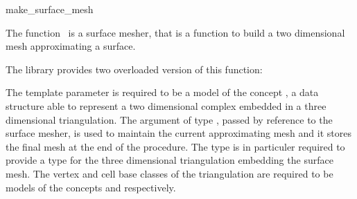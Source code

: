 

\begin{ccRefFunction}{make_surface_mesh}  %



\ccDefinition
  
The function \ccRefName\ is a surface mesher,
that is a function to build a two dimensional mesh 
approximating  a surface.

The library provides two overloaded version 
of this function:








\ccParameters
The template parameter  
is required to be a model of the concept
,
a data structure able to represent a two dimensional
complex  embedded in a three dimensional triangulation.
The argument  of type ,  passed by reference
to the surface mesher, 
is used to maintain  the current approximating mesh and it stores
the final mesh at the end of the procedure.
The type  is in particuler required to
provide a type 
for the three dimensional triangulation
embedding the surface mesh.
The vertex and cell base classes of the triangulation
 are required
to be  models  of the concepts 
 and 
 respectively.



\end{ccRefFunction}

